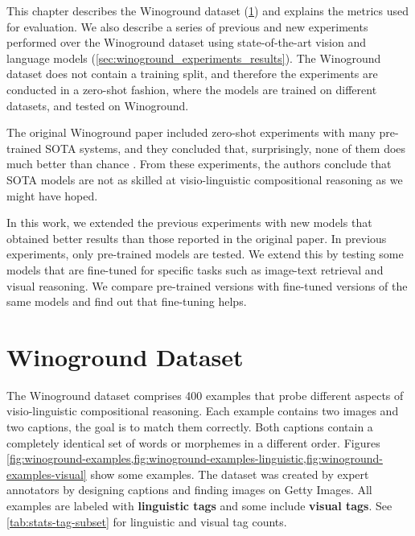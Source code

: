 This chapter describes the Winoground \cite{thrush2022winoground} dataset (\cref{sec:winoground_dataset}) and explains the metrics used for evaluation. We also describe a series of previous and new experiments performed over the Winoground dataset using state-of-the-art vision and language models (\cref{sec:winoground_experiments_results}). The Winoground dataset does not contain a training split, and therefore the experiments are conducted in a zero-shot fashion, where the models are trained on different datasets, and tested on Winoground.

The original Winoground paper included zero-shot experiments with many pre-trained SOTA systems, and they concluded that, surprisingly, none of them does much better than chance \cite{thrush2022winoground}. From these experiments, the authors conclude that SOTA models are not as skilled at visio-linguistic compositional reasoning as we might have hoped.

In this work, we extended the previous experiments with new models that obtained better results than those reported in the original paper. In previous experiments, only pre-trained models are tested. We extend this by testing some models that are fine-tuned for specific tasks such as image-text retrieval and visual reasoning. We compare pre-trained versions with fine-tuned versions of the same models and find out that fine-tuning helps.

\section{Winoground Dataset} \label{sec:winoground_dataset}

The Winoground dataset \cite{thrush2022winoground} comprises 400 examples that probe different aspects of visio-linguistic compositional reasoning. Each example contains two images and two captions, the goal
is to match them correctly. Both captions contain a completely identical set of words or morphemes in a different order. Figures \cref{fig:winoground-examples,fig:winoground-examples-linguistic,fig:winoground-examples-visual} show some examples. The dataset was created by expert annotators by designing captions and finding images on Getty Images. All examples are labeled with \textbf{linguistic tags} and some include \textbf{visual tags}. See \cref{tab:stats-tag-subset} for linguistic and visual tag counts.

